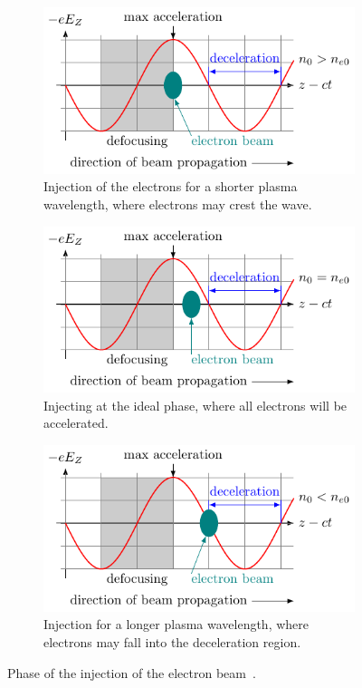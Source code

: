 \begin{figure}[!tb]
	\centering
	\begin{subfigure}{\linewidth}
		\centering
		\includegraphics[width=\textwidth]{figures/phases-a.pdf}
		\caption{Injection of the electrons for a shorter plasma wavelength,
		where electrons may crest the wave.}
		\label{fig:phase-a}
	\end{subfigure}
	\begin{subfigure}{\linewidth}
		\centering
		\includegraphics[width=\textwidth]{figures/phases-b.pdf}
		\caption{Injecting at the ideal phase, where all electrons will be
		accelerated.}
		\label{fig:phase-b}
	\end{subfigure}
	\begin{subfigure}{\linewidth}
		\centering
		\includegraphics[width=\textwidth]{figures/phases-c.pdf}
		\caption{Injection for a longer plasma wavelength, where electrons may
		fall into the deceleration region.}
		\label{fig:phase-c}
	\end{subfigure}
	\caption{
		Phase of the injection of the electron
		beam~\cite{wiedemann2007particle}.
	}
	\label{fig:phases}
\end{figure}


